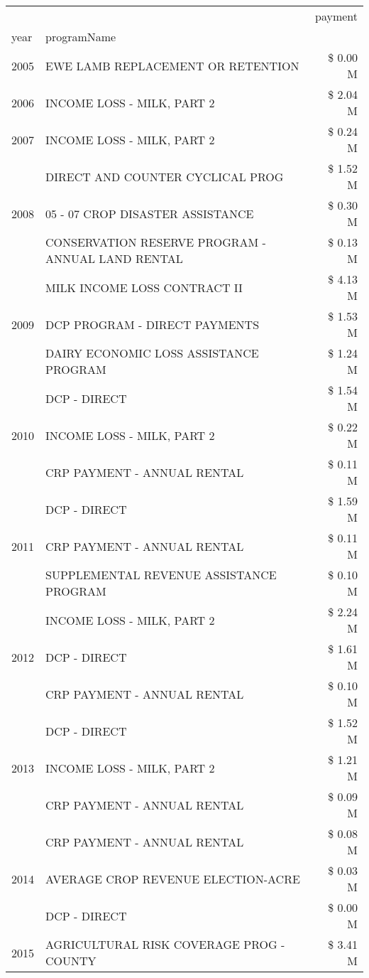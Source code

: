 \begin{tabular}{llr}
\toprule
 &  & payment \\
year & programName &  \\
\midrule
2005 & EWE LAMB REPLACEMENT OR RETENTION & \$ 0.00 M \\
\cline{1-3}
2006 & INCOME LOSS - MILK, PART 2 & \$ 2.04 M \\
\cline{1-3}
2007 & INCOME LOSS - MILK, PART 2 & \$ 0.24 M \\
\cline{1-3}
\multirow[t]{3}{*}{2008} & DIRECT AND COUNTER CYCLICAL PROG & \$ 1.52 M \\
 & 05 - 07 CROP DISASTER ASSISTANCE & \$ 0.30 M \\
 & CONSERVATION RESERVE PROGRAM - ANNUAL LAND RENTAL & \$ 0.13 M \\
\cline{1-3}
\multirow[t]{3}{*}{2009} & MILK INCOME LOSS CONTRACT II & \$ 4.13 M \\
 & DCP PROGRAM - DIRECT PAYMENTS & \$ 1.53 M \\
 & DAIRY ECONOMIC LOSS ASSISTANCE PROGRAM & \$ 1.24 M \\
\cline{1-3}
\multirow[t]{3}{*}{2010} & DCP - DIRECT & \$ 1.54 M \\
 & INCOME LOSS - MILK, PART 2 & \$ 0.22 M \\
 & CRP PAYMENT - ANNUAL RENTAL & \$ 0.11 M \\
\cline{1-3}
\multirow[t]{3}{*}{2011} & DCP - DIRECT & \$ 1.59 M \\
 & CRP PAYMENT - ANNUAL RENTAL & \$ 0.11 M \\
 & SUPPLEMENTAL REVENUE ASSISTANCE PROGRAM & \$ 0.10 M \\
\cline{1-3}
\multirow[t]{3}{*}{2012} & INCOME LOSS - MILK, PART 2 & \$ 2.24 M \\
 & DCP - DIRECT & \$ 1.61 M \\
 & CRP PAYMENT - ANNUAL RENTAL & \$ 0.10 M \\
\cline{1-3}
\multirow[t]{3}{*}{2013} & DCP - DIRECT & \$ 1.52 M \\
 & INCOME LOSS - MILK, PART 2 & \$ 1.21 M \\
 & CRP PAYMENT - ANNUAL RENTAL & \$ 0.09 M \\
\cline{1-3}
\multirow[t]{3}{*}{2014} & CRP PAYMENT - ANNUAL RENTAL & \$ 0.08 M \\
 & AVERAGE CROP REVENUE ELECTION-ACRE & \$ 0.03 M \\
 & DCP - DIRECT & \$ 0.00 M \\
\cline{1-3}
\multirow[t]{3}{*}{2015} & AGRICULTURAL RISK COVERAGE PROG - COUNTY & \$ 3.41 M \\

\end{tabular}
